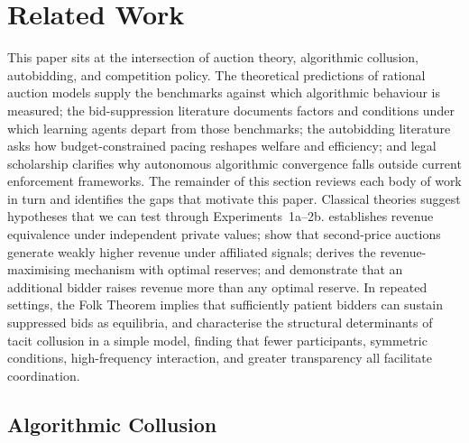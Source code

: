 \section{Related Work}
\label{sec:literature}

This paper sits at the intersection of auction theory, algorithmic collusion, autobidding, and competition policy. The theoretical predictions of rational auction models supply the benchmarks against which algorithmic behaviour is measured; the bid-suppression literature documents factors and conditions under which learning agents depart from those benchmarks; the autobidding literature asks how budget-constrained pacing reshapes welfare and efficiency; and legal scholarship clarifies why autonomous algorithmic convergence falls outside current enforcement frameworks. The remainder of this section reviews each body of work in turn and identifies the gaps that motivate this paper. Classical theories suggest hypotheses that we can test through Experiments~1a--2b. \citet{Vickrey1961} establishes revenue equivalence under independent private values; \citet{MilgromWeber1982} show that second-price auctions generate weakly higher revenue under affiliated signals; \citet{Myerson1981} derives the revenue-maximising mechanism with optimal reserves; and \citet{BulowKlemperer1996} demonstrate that an additional bidder raises revenue more than any optimal reserve. In repeated settings, the Folk Theorem implies that sufficiently patient bidders can sustain suppressed bids as equilibria, and \citet{Ivaldi2003} characterise the structural determinants of tacit collusion in a simple model, finding that fewer participants, symmetric conditions, high-frequency interaction, and greater transparency all facilitate coordination.

\subsection{Algorithmic Collusion}

